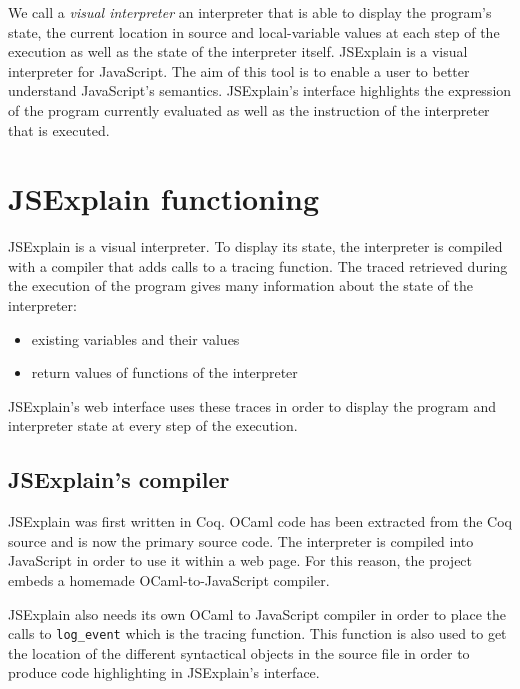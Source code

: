 \documentclass[twocolumn]{article}
\begin{document}
We call a \emph{visual interpreter} an interpreter that is able to display the
program's state, the current location in source and local-variable values at
each step of the execution as well as the state of the interpreter itself.
JSExplain is a visual interpreter for JavaScript. The aim of this tool is to
enable a user to better understand JavaScript's semantics. JSExplain's
interface highlights the expression of the program currently evaluated as well
as the instruction of the interpreter that is executed.

\section{JSExplain functioning}

JSExplain is a visual interpreter. To display its state, the interpreter is
compiled with a compiler that adds calls to a tracing function. The traced
retrieved during the execution of the program gives many information about the
state of the interpreter:

\begin{itemize}
  \item existing variables and their values
  \item return values of functions of the interpreter
\end{itemize}

JSExplain's web interface uses these traces in order to display the program and
interpreter state at every step of the execution.

\subsection{JSExplain's compiler}

JSExplain was first written in Coq. OCaml code has been extracted from the Coq
source and is now the primary source code. The interpreter is compiled into
JavaScript in order to use it within a web page. For this reason, the project
embeds a homemade OCaml-to-JavaScript compiler.

JSExplain also needs its own OCaml to JavaScript compiler in order to place the
calls to \verb|log_event| which is the tracing function. This function is also
used to get the location of the different syntactical objects in the source
file in order to produce code highlighting in JSExplain's interface.



\end{document}
